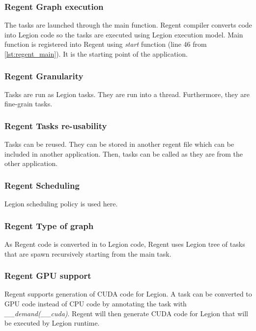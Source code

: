 \subsubsection{Regent Graph execution}
The tasks are launched through the main function.
Regent compiler converts code into Legion code so the tasks are executed using Legion execution model.
Main function is registered into Regent using \textit{start} function (line 46 from \ref{lst:regent_main}).
It is the starting point of the application.


\subsubsection{Regent Granularity}
Tasks are run as Legion tasks.
They are run into a thread.
Furthermore, they are fine-grain tasks.

\subsubsection{Regent Tasks re-usability}
Tasks can be reused.
They can be stored in another regent file which can be included in another application.
Then, tasks can be called as they are from the other application.

\subsubsection{Regent Scheduling}
Legion scheduling policy is used here.

\subsubsection{Regent Type of graph}
As Regent code is converted in to Legion code, Regent uses Legion tree of tasks that are spawn recursively starting from the main task.

\subsubsection{Regent GPU support}
Regent supports generation of CUDA code for Legion.
A task can be converted to GPU code instead of CPU code by annotating the task with \textit{\_\_demand(\_\_cuda)}.
Regent will then generate CUDA code for Legion that will be executed by Legion runtime.


